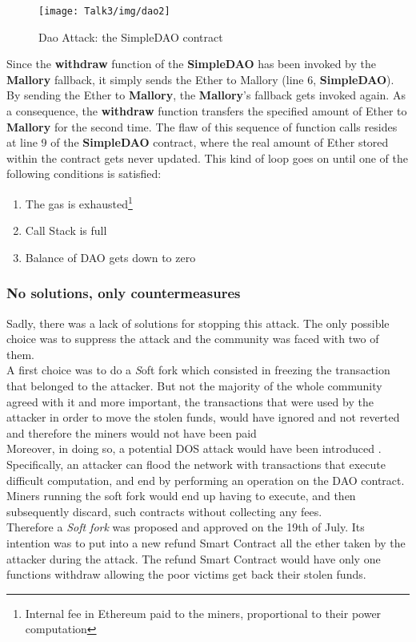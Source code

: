 \begin{figure}[H]
\begin{center}
\texttt{[image: Talk3/img/dao2]}
\end{center}
\caption{Dao Attack: the SimpleDAO contract}
\label{label}
\end{figure}
Since the \textbf{withdraw} function of the \textbf{SimpleDAO} has been invoked by the \textbf{Mallory} fallback, it simply sends the Ether to Mallory (line 6, \textbf{SimpleDAO}). By sending the Ether to \textbf{Mallory}, the \textbf{Mallory}'s fallback gets invoked again. As a consequence, the \textbf{withdraw} function transfers the specified amount of Ether to \textbf{Mallory} for the second time. The flaw of this sequence of function calls resides at line 9 of the \textbf{SimpleDAO} contract, where the real amount of Ether stored within the contract gets never updated. 
This kind of loop goes on until one of the following conditions is satisfied: \\
\begin{enumerate}
\item The gas is exhausted\footnote{Internal fee in Ethereum paid to the miners, proportional to their power computation\cite{SC11}}
\item Call Stack is full
\item Balance of DAO gets down to zero  
\end{enumerate}





\subsubsection{No solutions, only countermeasures}
Sadly, there was a lack of solutions for stopping this attack. The only possible choice was to suppress the attack and the community was faced with two of them.
\\A first choice was to do a {\textit Soft fork} which consisted in freezing the transaction that belonged to the attacker. But not the majority of the whole community agreed with it and more important, the transactions that were used by the attacker in order to move the stolen funds, would have ignored and not reverted and therefore the miners would not have been paid
\\Moreover, in doing so, a potential DOS attack would have been introduced \cite{ok}. 
Specifically, an attacker can flood the network with transactions that execute difficult computation, and end by performing an operation on the DAO contract. Miners running the soft fork would end up having to execute, and then subsequently discard, such contracts without collecting any fees.
\\Therefore a \textit{Soft fork} was proposed and approved on the 19th of July. Its intention was to put into a new refund Smart Contract all the ether taken by the attacker during the attack. The refund Smart Contract would have only one functions withdraw allowing the poor victims get back their stolen funds.
